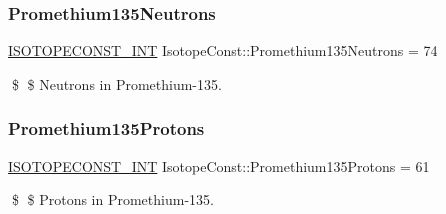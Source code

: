 \subsubsection{\texorpdfstring{Promethium135\+Neutrons}{Promethium135Neutrons}}
{\footnotesize\ttfamily \mbox{\hyperlink{group___isotope_const-_macros_ga5f18360b3e99483a35c32d789e62621c}{I\+S\+O\+T\+O\+P\+E\+C\+O\+N\+S\+T\+\_\+\+I\+NT}} Isotope\+Const\+::\+Promethium135\+Neutrons = 74}

\$ \$ Neutrons in Promethium-\/135. \mbox{\label{group___isotope_const-_promethium-_pm135_ga3dc6d7ca76d5f506b784fecc058c6a11}} 
\subsubsection{\texorpdfstring{Promethium135\+Protons}{Promethium135Protons}}
{\footnotesize\ttfamily \mbox{\hyperlink{group___isotope_const-_macros_ga5f18360b3e99483a35c32d789e62621c}{I\+S\+O\+T\+O\+P\+E\+C\+O\+N\+S\+T\+\_\+\+I\+NT}} Isotope\+Const\+::\+Promethium135\+Protons = 61}

\$ \$ Protons in Promethium-\/135. 